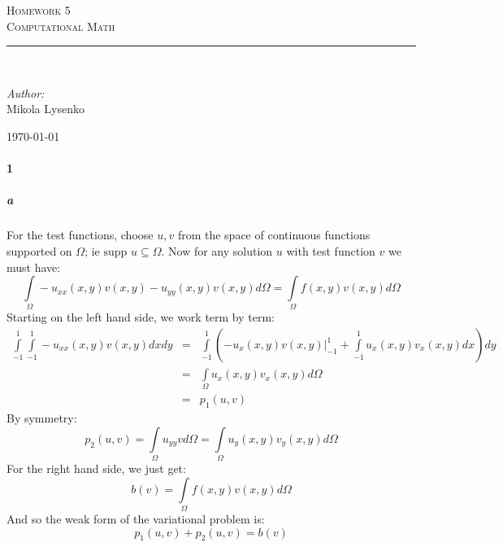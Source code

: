 \documentclass{article}
\newcommand{\HRule}{\rule{\linewidth}{0.5mm}}
\begin{document}

\begin{titlepage}
 
\begin{center}
 
\textsc{\LARGE Homework 5}\\[1.5cm] 

\textsc{\Large Computational Math}\\[0.5cm]
 
 
\HRule \\[2cm]
 
\begin{minipage}{0.4\textwidth}
\begin{flushleft} \large
\emph{Author:}\\
Mikola Lysenko
\end{flushleft}
\end{minipage}
 
\vfill
 
{\large \today}
 
\end{center}
 
\end{titlepage}


\paragraph{1}

\subparagraph{a}
For the test functions, choose $u,v$ from the space of continuous functions supported on $\Omega$; ie $\text{supp } u \subseteq \Omega$.  Now for any solution $u$ with test function $v$ we must have:
\[ \int \limits_{\Omega} - u_{xx}(x,y) v(x,y) - u_{yy}(x,y) v(x,y) d \Omega = \int \limits_{\Omega} f(x,y) v(x,y) d \Omega \]
Starting on the left hand side, we work term by term:
\begin{eqnarray*}
\int \limits_{-1}^{1} \int \limits_{-1}^{1} -u_{xx}(x,y) v(x,y) dx dy & = &
\int \limits_{-1}^{1} \left( -u_x(x,y) v(x,y) |_{-1}^{1} + \int \limits_{-1}^{1} u_{x}(x,y) v_{x}(x,y) dx \right) dy \\
& = & \int \limits_{\Omega} u_{x}(x,y) v_{x}(x,y) d \Omega \\
& = & p_1(u, v)
\end{eqnarray*}
By symmetry:
\[ p_2(u,v) = \int \limits_{\Omega} u_{yy} v d \Omega = \int \limits_{\Omega} u_{y}(x,y) v_{y}(x,y) d \Omega \]
For the right hand side, we just get:
\[ b(v) = \int \limits_{\Omega} f(x,y) v(x,y) d \Omega \]
And so the weak form of the variational problem is:
\[ p_1(u,v) + p_2(u,v) = b(v) \]
\end{document}
